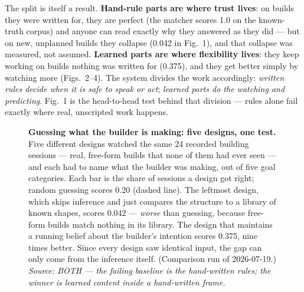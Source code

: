 \documentclass[11pt]{article}
\begin{document}
The split is itself a result. \textbf{Hand-rule parts are where trust lives}:
on builds they were written for, they are perfect (the matcher scores 1.0 on
the known-truth corpus) and anyone can read exactly why they answered as they
did --- but on new, unplanned builds they collapse (0.042 in Fig.~1), and that
collapse was measured, not assumed. \textbf{Learned parts are where
flexibility lives}: they keep working on builds nothing was written for
(0.375), and they get better simply by watching more (Figs.~2--4). The system
divides the work accordingly: \emph{written rules decide when it is safe to
speak or act}; \emph{learned parts do the watching and predicting}. Fig.~1 is
the head-to-head test behind that division --- rules alone fail exactly where
real, unscripted work happens.

\begin{figure}[h]
\centering
{}
\caption{\textbf{Guessing what the builder is making: five designs, one test.}
Five different designs watched the same 24 recorded building sessions --- real,
free-form builds that none of them had ever seen --- and each had to name what
the builder was making, out of five goal categories. Each bar is the share of
sessions a design got right; random guessing scores 0.20 (dashed line). The
leftmost design, which skips inference and just compares the structure to a
library of known shapes, scores 0.042 --- \emph{worse} than guessing, because
free-form builds match nothing in its library. The design that maintains a
running belief about the builder's intention scores 0.375, nine times better.
Since every design saw identical input, the gap can only come from the
inference itself. (Comparison run of 2026-07-19.)
\textit{Source: BOTH --- the failing baseline is the hand-written rules; the
winner is learned content inside a hand-written frame.}}
\end{figure}
\end{document}
